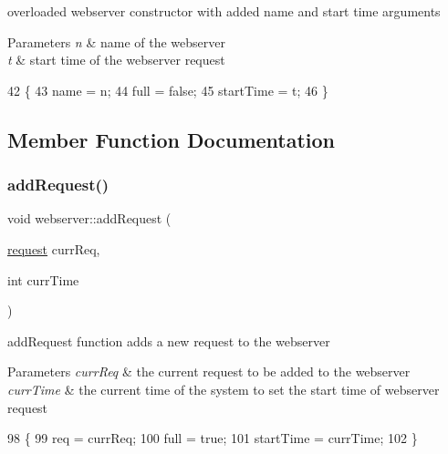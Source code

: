 overloaded webserver constructor with added name and start time arguments 
\begin{DoxyParams}{Parameters}
{\em n} & name of the webserver \\
\hline
{\em t} & start time of the webserver request \\
\hline
\end{DoxyParams}

\begin{DoxyCode}
42                                  \{
43             name = n;
44             full = \textcolor{keyword}{false};
45             startTime = t;
46         \}
\end{DoxyCode}


\subsection{Member Function Documentation}
\mbox{\label{classwebserver_a013eb6e8956b29bcc13608bb54bd2cc5}} 
\subsubsection{\texorpdfstring{add\+Request()}{addRequest()}}
{\footnotesize\ttfamily void webserver\+::add\+Request (\begin{DoxyParamCaption}\item[{\hyperlink{structrequest}{request}}]{curr\+Req,  }\item[{int}]{curr\+Time }\end{DoxyParamCaption})\hspace{0.3cm}{\ttfamily [inline]}}

add\+Request function adds a new request to the webserver 
\begin{DoxyParams}{Parameters}
{\em curr\+Req} & the current request to be added to the webserver \\
\hline
{\em curr\+Time} & the current time of the system to set the start time of webserver request \\
\hline
\end{DoxyParams}

\begin{DoxyCode}
98                                                        \{
99             req = currReq;
100             full = \textcolor{keyword}{true};
101             startTime = currTime;
102         \}
\end{DoxyCode}
\mbox{\label{classwebserver_ab2c7ce0a757e7f5e6c9c33d1e7ff1cbc}} 

